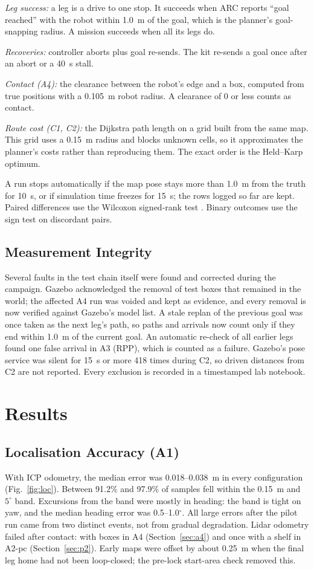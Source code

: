 \documentclass[conference]{IEEEtran}
\begin{document}
\textit{Leg success:} a leg is a drive to one stop. It succeeds when ARC reports ``goal reached'' with the robot within 1.0~m of the goal, which is the planner's goal-snapping radius. A mission succeeds when all its legs do.

\textit{Recoveries:} controller aborts plus goal re-sends. The kit re-sends a goal once after an abort or a 40~s stall.

\textit{Contact (A4):} the clearance between the robot's edge and a box, computed from true positions with a 0.105~m robot radius. A clearance of 0 or less counts as contact.

\textit{Route cost (C1, C2):} the Dijkstra path length on a grid built from the same map. This grid uses a 0.15~m radius and blocks unknown cells, so it approximates the planner's costs rather than reproducing them. The exact order is the Held--Karp optimum.

A run stops automatically if the map pose stays more than 1.0~m from the truth for 10~s, or if simulation time freezes for 15~s; the rows logged so far are kept. Paired differences use the Wilcoxon signed-rank test \cite{wilcoxon1945}. Binary outcomes use the sign test on discordant pairs.

\subsection{Measurement Integrity}
Several faults in the test chain itself were found and corrected during the campaign. Gazebo acknowledged the removal of test boxes that remained in the world; the affected A4 run was voided and kept as evidence, and every removal is now verified against Gazebo's model list. A stale replan of the previous goal was once taken as the next leg's path, so paths and arrivals now count only if they end within 1.0~m of the current goal. An automatic re-check of all earlier legs found one false arrival in A3 (RPP), which is counted as a failure. Gazebo's pose service was silent for 15~s or more 418 times during C2, so driven distances from C2 are not reported. Every exclusion is recorded in a timestamped lab notebook.

\section{Results}

\subsection{Localisation Accuracy (A1)}
With ICP odometry, the median error was 0.018--0.038~m in every configuration (Fig.~\ref{fig:loc}). Between 91.2\% and 97.9\% of samples fell within the 0.15~m and $5^\circ$ band. Excursions from the band were mostly in heading: the band is tight on yaw, and the median heading error was 0.5--1.0$^\circ$. All large errors after the pilot run came from two distinct events, not from gradual degradation. Lidar odometry failed after contact: with boxes in A4 (Section~\ref{sec:a4}) and once with a shelf in A2-pc (Section~\ref{sec:p2}). Early maps were offset by about 0.25~m when the final leg home had not been loop-closed; the pre-lock start-area check removed this.
\end{document}
